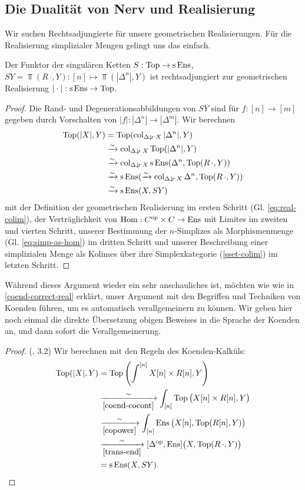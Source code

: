 \subsection{Die Dualität von Nerv und Realisierung}

Wir suchen Rechtsadjungierte für unsere geometrischen
Realisierungen. Für die Realisierung simplizialer Mengen gelingt uns
das einfach.
\begin{satz}
  Der Funktor der singulären Ketten $S: \operatorname{Top} \to \operatorname{s}\operatorname{Ens}$, $SY
  = \Top(R \, \cdot, Y): [n] \mapsto \Top(|\Delta^n|, Y)$ ist
  rechtsadjungiert zur geometrischen Realisierung
  $|\cdot|: \operatorname{s}\operatorname{Ens} \to \operatorname{Top}$.
\end{satz}
\begin{proof}
  Die Rand- und Degenerationsabbildungen von $SY$ sind für $f: [n] \to
  [m]$ gegeben durch Vorschalten von $|f|: |\Delta^n| \to
  |\Delta^m|$. Wir berechnen
  \begin{align*}
    \operatorname{Top}(|X|, Y)
    & = \operatorname{Top}(\operatorname{col}_{\Delta \downarrow \! {\scriptstyle r} \, X} |\Delta^n|, Y) \\
    & \xrightarrow[]{\sim} \operatorname{col}_{\Delta \downarrow \! {\scriptstyle r} \, X} \operatorname{Top}(|\Delta^n|, Y) \\
    & \xrightarrow[]{\sim} \operatorname{col}_{\Delta \downarrow \! {\scriptstyle r} \, X} \operatorname{s}\operatorname{Ens}(\Delta^n, \operatorname{Top}(R \, \cdot, Y)) \\
    & \xrightarrow[]{\sim} \operatorname{s}\operatorname{Ens}(\xrightarrow[]{\sim} \operatorname{col}_{\Delta \downarrow \! {\scriptstyle r} \, X} \Delta^n, \operatorname{Top}(R \, \cdot, Y)) \\
    & \xrightarrow[]{\sim} \operatorname{s}\operatorname{Ens}(X, SY)
  \end{align*}  
  mit der Definition der geometrischen Realisierung im ersten Schritt
  (Gl. \ref{eq:real-colim}), der Verträglichkeit von $\operatorname{Hom}:
  C^\mathrm{op} \times C \to \operatorname{Ens}$ mit Limites im zweiten und vierten Schritt,
  unserer Bestimmung der $n$-Simplizes als Morphismenmenge
  (Gl. \ref{eq:simp-as-hom}) im dritten Schritt und unserer
  Beschreibung einer simplizialen Menge als Kolimes über ihre
  Simplexkategorie (\ref{sset-colim}) im letzten Schritt.
\end{proof}
Während dieses Argument wieder ein sehr anschauliches ist, möchten wie
wie in \ref{coend-correct-real} erklärt, unser Argument mit den
Begriffen und Techniken von Koenden führen, um es automatisch
verallgemeinern zu können. Wir geben hier noch einmal die direkte
Übersetzung obigen Beweises in die Sprache der Koenden an, und dann
sofort die Verallgemeinerung.
\begin{proof} (\cite{Lore}, 3.2)
  Wir berechnen mit den Regeln des Koenden-Kalküls:
  \begin{align*}
     \operatorname{Top}(|X|, Y)
     &= \operatorname{Top} \left( \int^{[n]} X[n] \times R[n], Y \right) \\
     & \xrightarrow[\ref{coend-cocont}]{\sim}
       \int_{[n]} \operatorname{Top} \big( X[n] \times R[n], Y \big) \\
     & \xrightarrow[\ref{copower}]{\sim}
       \int_{[n]} \operatorname{Ens} \big( X[n], \operatorname{Top}(R[n], Y) \big) \\
     & \xrightarrow[\ref{trans-end}]{\sim}
       [\Delta^\mathrm{op}, \operatorname{Ens}] \big( X, \operatorname{Top}(R \, \cdot, Y) \big) \\
     &= \operatorname{s}\operatorname{Ens}(X, SY).
  \end{align*}
\end{proof}

